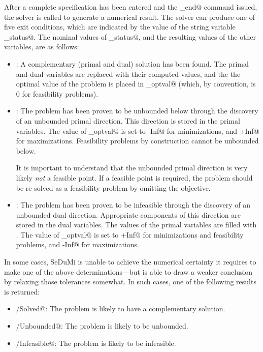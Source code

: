\documentclass[12pt]{article}
\begin{document}
After a complete \cvx specification has been entered and the \verb@cvx_end@ command 
issued, the solver is called to generate a numerical result. The solver can produce
one of five exit conditions, which are indicated by the value of the string variable
\verb@cvx_status@. The nominal values of \verb@cvx_status@, and the resulting 
values of the other variables, are as follows:
\begin{itemize}
	\item \verb@Solved@: A complementary (primal and dual)
solution has been found.
	      The primal and dual variables are replaced with their computed values, and the
	      the optimal value of the problem is placed in \verb@cvx_optval@ (which, by
	      convention, is $0$ for feasibility problems).
	\item \verb@Unbounded@: The problem has been proven to be unbounded below
	      through the discovery of an unbounded primal direction. This direction
	      is stored in the primal variables. The value of \verb@cvx_optval@
	      is set to \verb@-Inf@ for minimizations, and
	      \verb@+Inf@ for maximizations. Feasibility problems by construction
	      cannot be unbounded below.
	      
	      It is important to understand that the unbounded primal direction is very
	      likely \emph{not} a feasible point. If a feasible point is required, the 
	      problem should be re-solved as a feasibility problem by omitting the objective.
	\item \verb@Infeasible@: The problem has been proven to be infeasible
	      through the discovery of an unbounded dual direction. Appropriate
	      components of this direction are stored in the dual variables. The values of the
	      primal variables are filled with \verb@NaN@s. The value of \verb@cvx_optval@
	      is set to \verb@+Inf@ for minimizations and feasibility problems,
	      and \verb@-Inf@ for maximizations.
\end{itemize}
In some cases, SeDuMi is unable to achieve the numerical certainty it requires to
make one of the above determinations---but is able to draw a weaker conclusion
by relaxing those tolerances somewhat. In such cases, one of the following
results is returned:
\begin{itemize}
	\item \verb@Inaccurate/Solved@: The problem is likely to have 
a complementary solution.
	\item \verb@Inaccurate/Unbounded@: The problem is likely to be unbounded.
	\item \verb@Inaccurate/Infeasible@: The problem is likely to be infeasible.
\end{itemize}
\end{document}
